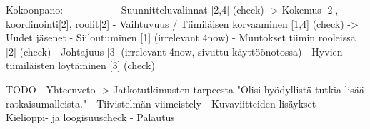 Kokoonpano:
--------------
- Suunnitteluvalinnat                       [2,4] (check)
    -> Kokemus [2], koordinointi[2], roolit[2]
- Vaihtuvuus / Tiimiläisen korvaaminen      [1,4] (check)
    -> Uudet jäsenet
- Siiloutuminen                             [1] (irrelevant 4now)
- Muutokset tiimin rooleissa                [2] (check)
- Johtajuus                                 [3] (irrelevant 4now, sivuttu käyttöönotossa)
- Hyvien tiimiläisten löytäminen            [3] (check)

    TODO    
- Yhteenveto
-> Jatkotutkimusten tarpeesta "Olisi hyödyllistä tutkia lisää ratkaisumalleista."
- Tiivistelmän viimeistely
- Kuvaviitteiden lisäykset
- Kielioppi- ja loogisuuscheck
- Palautus
